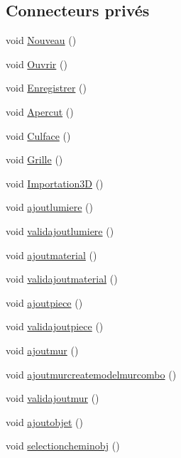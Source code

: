 \subsection*{Connecteurs privés}
\begin{DoxyCompactItemize}
\item 
void \hyperlink{class_main_window_a6f837f331c40d27e47fbb0d6a73b040e}{Nouveau} ()
\item 
void \hyperlink{class_main_window_adbc60f34a13a49cc015dc4a124a588a1}{Ouvrir} ()
\item 
void \hyperlink{class_main_window_a8c07d91b87178ac0a1b88aabc45c6ddb}{Enregistrer} ()
\item 
void \hyperlink{class_main_window_a019328eaf07af3c9b8850e3db14fdf30}{Apercut} ()
\item 
void \hyperlink{class_main_window_a0b391dfd82e868b6f8badbc9717d6f49}{Culface} ()
\item 
void \hyperlink{class_main_window_a9a4d5849cf40a3ce50941e56cfa0be35}{Grille} ()
\item 
void \hyperlink{class_main_window_af26018b1d699cbf0a3f62048472cc489}{Importation3\+D} ()
\item 
void \hyperlink{class_main_window_a42d29fe9a2657a5c5563b3f1235a28e4}{ajoutlumiere} ()
\item 
void \hyperlink{class_main_window_a56f65a459f0caca9f71251663b200431}{validajoutlumiere} ()
\item 
void \hyperlink{class_main_window_a3a599353265f9c01a8780529aa5fed75}{ajoutmaterial} ()
\item 
void \hyperlink{class_main_window_a2d8cee622b78ccdeed758c51b9fb5b0e}{validajoutmaterial} ()
\item 
void \hyperlink{class_main_window_a6661770cd92877aa3b1c0dae91513a50}{ajoutpiece} ()
\item 
void \hyperlink{class_main_window_ada60d01c441123e1b7d4d30be1d16f8f}{validajoutpiece} ()
\item 
void \hyperlink{class_main_window_a3d19fc185c807148a627777459737754}{ajoutmur} ()
\item 
void \hyperlink{class_main_window_a282b0371fa087fba28044fd05f38301b}{ajoutmurcreatemodelmurcombo} ()
\item 
void \hyperlink{class_main_window_afcd72c860bccb97abd7af324fbc50f56}{validajoutmur} ()
\item 
void \hyperlink{class_main_window_a54645636f58b920914895b422a00ed85}{ajoutobjet} ()
\item 
void \hyperlink{class_main_window_a8ba990d0c3e19d63dbcff0328a85358b}{selectioncheminobj} ()

\end{DoxyCompactItemize}
